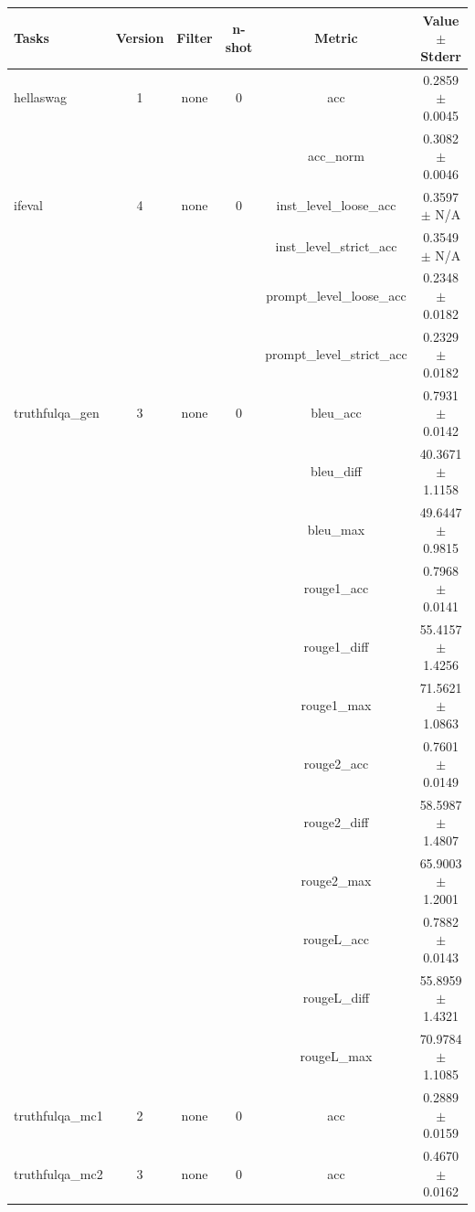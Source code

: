 \documentclass{ifacconf}
\begin{document}
\vfill
\clearpage
\pagebreak

\begin{strip}
\begin{minipage}{\textwidth}
    \begin{table}[H]
    \centering
    \begin{tabular}{|l|c|c|c|c|c|}
    \hline
    \textbf{Tasks} & \textbf{Version} & \textbf{Filter} & \textbf{n-shot} & \textbf{Metric} & \textbf{Value} $\pm$ \textbf{Stderr} \\ \hline
    hellaswag & 1 & none & 0 & acc & 0.2859 $\pm$ 0.0045 \\ \hline
    & & & & acc\_norm & 0.3082 $\pm$ 0.0046 \\ \hline
    ifeval & 4 & none & 0 & inst\_level\_loose\_acc & 0.3597 $\pm$ N/A \\ \hline
    & & & & inst\_level\_strict\_acc & 0.3549 $\pm$ N/A \\ \hline
    & & & & prompt\_level\_loose\_acc & 0.2348 $\pm$ 0.0182 \\ \hline
    & & & & prompt\_level\_strict\_acc & 0.2329 $\pm$ 0.0182 \\ \hline
    truthfulqa\_gen & 3 & none & 0 & bleu\_acc & 0.7931 $\pm$ 0.0142 \\ \hline
    & & & & bleu\_diff & 40.3671 $\pm$ 1.1158 \\ \hline
    & & & & bleu\_max & 49.6447 $\pm$ 0.9815 \\ \hline
    & & & & rouge1\_acc & 0.7968 $\pm$ 0.0141 \\ \hline
    & & & & rouge1\_diff & 55.4157 $\pm$ 1.4256 \\ \hline
    & & & & rouge1\_max & 71.5621 $\pm$ 1.0863 \\ \hline
    & & & & rouge2\_acc & 0.7601 $\pm$ 0.0149 \\ \hline
    & & & & rouge2\_diff & 58.5987 $\pm$ 1.4807 \\ \hline
    & & & & rouge2\_max & 65.9003 $\pm$ 1.2001 \\ \hline
    & & & & rougeL\_acc & 0.7882 $\pm$ 0.0143 \\ \hline
    & & & & rougeL\_diff & 55.8959 $\pm$ 1.4321 \\ \hline
    & & & & rougeL\_max & 70.9784 $\pm$ 1.1085 \\ \hline
    truthfulqa\_mc1 & 2 & none & 0 & acc & 0.2889 $\pm$ 0.0159 \\ \hline
    truthfulqa\_mc2 & 3 & none & 0 & acc & 0.4670 $\pm$ 0.0162 \\ \hline
    \end{tabular}
    \label{tab:gemma2_q8}
    \end{table}


\end{minipage}
\end{strip}
\end{document}

